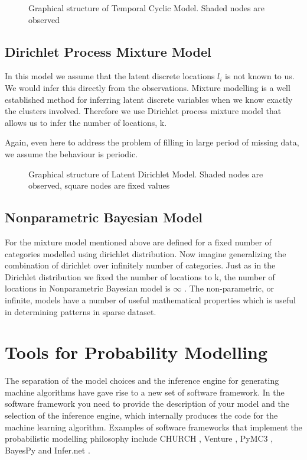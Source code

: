 \begin{figure}[htb] 
\centering 
\def\svgwidth{200pt} 
 
\caption{Graphical structure of Temporal Cyclic Model. Shaded nodes are observed} 
\end{figure} 

\FloatBarrier
\subsection*{Dirichlet Process Mixture Model}
\label{sec:dp model}
In this model we assume that the latent discrete locations $l_i$ is not known to us. We would infer this directly from the observations.
Mixture modelling is a well established method for inferring latent discrete variables when we know exactly the clusters involved.
Therefore we use Dirichlet process mixture model that allows us to infer the number of locations, k.

Again, even here to address the problem of filling in large period of missing data, we assume the behaviour is periodic.
\begin{figure}[htb] 
\centering 
\def\svgwidth{450pt} 
 
\caption{Graphical structure of Latent Dirichlet Model. Shaded nodes are observed, square nodes are fixed values} 
\end{figure} 

\FloatBarrier
\subsection*{Nonparametric Bayesian Model}
For the mixture model mentioned above are defined for a fixed number of categories modelled using dirichlet distribution. Now imagine generalizing the combination of dirichlet over infinitely number of categories. Just as in the Dirichlet distribution we fixed the number of locations to k, the number of locations in Nonparametric Bayesian model is $ \infty $ . The non-parametric, or infinite, models have a number of useful mathematical properties which is useful in determining patterns in sparse dataset.



\section{Tools for Probability Modelling}
\label{sec:tools}

The separation of the model choices and the inference engine for generating machine algorithms have gave rise to a new set of software framework.
In the software framework you need to provide the description of your model and the selection of the inference engine, which internally produces the code for the machine learning algorithm.
Examples of software frameworks that implement the probabilistic modelling philosophy  include CHURCH \cite{goodman_church_2012}, Venture \cite{mansinghka_venture_2014}, PyMC3 \cite{salvatier_probabilistic_2015}, BayesPy \cite{luttinen_bayespy_2014} and Infer.net \cite{minka_2010} .


